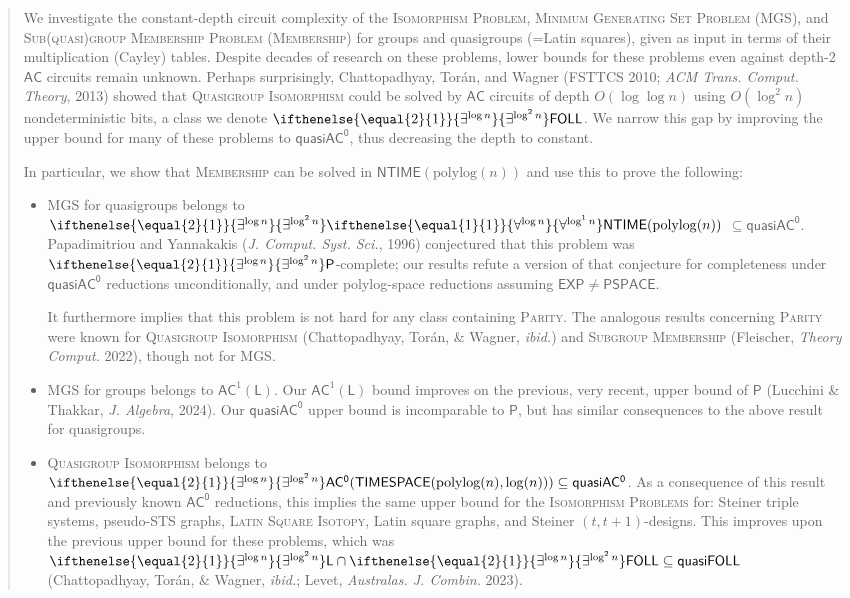 \documentclass{article}
\newcommand{\algprobm}[1]{\textsc{#1}\xspace}
\newcommand{\betacc}[1]{\ifthenelse{\equal{#1}{1}}{\exists^{\log n}}{\exists^{\log^{#1}n}}} %
\newcommand{\alphacc}[1]{\ifthenelse{\equal{#1}{1}}{\forall^{\log n}}{\forall^{\log^{#1}n}}} %
\newcommand*{\ComplexityClass}[1]{\ensuremath{\mathsf{#1}}\xspace}
\renewcommand{\P}{\ComplexityClass{P}}
\newcommand*{\EXP}{\ComplexityClass{EXP}}
\newcommand*{\LogSpace}{\ComplexityClass{L}}
\newcommand*{\PSPACE}{\ComplexityClass{PSPACE}}
\newcommand{\AC}{\ComplexityClass{AC}}
\newcommand{\ACz}{\ComplexityClass{AC^0}}
\newcommand{\qACz}{\ComplexityClass{quasiAC^0}}
\newcommand{\FOLL}{\ComplexityClass{FOLL}}
\newcommand{\NTIME}{\ComplexityClass{NTIME}}
\begin{document}
\begin{abstract}
We investigate the constant-depth 
circuit complexity 
of the \algprobm{Isomorphism Problem}, \algprobm{Minimum Generating Set Problem} (\algprobm{MGS}), and \algprobm{Sub(quasi)group Membership Problem} (\algprobm{Membership})  for groups and quasigroups (=Latin squares), given as input in terms of their multiplication (Cayley) tables.
Despite decades of research on these problems, lower bounds for these problems even against  depth-$2$ $\AC$ circuits remain unknown. Perhaps surprisingly, Chattopadhyay, Torán, and Wagner (FSTTCS 2010; \emph{ACM Trans. Comput. Theory}, 2013) showed that \algprobm{Quasigroup Isomorphism} could be solved by $\AC$ circuits of depth $O(\log \log n)$ using $O(\log^2 n)$ nondeterministic bits, a class we denote $\betacc{2}\FOLL$. We narrow this gap by improving the upper bound for many of these problems to $\qACz$, thus decreasing the depth to constant.

In particular, we show that \algprobm{Membership} can be solved in $\NTIME(\mathrm{polylog}(n))$ and use this to prove the following:
\begin{itemize}
\item \algprobm{MGS} for quasigroups belongs to $\betacc{2}\alphacc{1}\NTIME(\mathrm{polylog}(n))$ $\subseteq \qACz$. Papadimitriou and Yannakakis (\emph{J. Comput. Syst. Sci.}, 1996) conjectured that this problem was $\betacc{2}\P$-complete; our results refute a version of that conjecture for completeness under $\qACz$ reductions unconditionally, and under polylog-space reductions assuming $\EXP \neq \PSPACE$. 

It furthermore implies that this problem is not hard for any class containing \algprobm{Parity}. The analogous results concerning \algprobm{Parity} were known for \algprobm{Quasigroup Isomorphism} (Chattopadhyay, Tor\'an, \& Wagner, \emph{ibid.}) and \algprobm{Subgroup Membership} (Fleischer, \textit{Theory Comput.} 2022), though not for \algprobm{MGS}.

\item \algprobm{MGS} for groups belongs to $\AC^{1}(\LogSpace)$. Our $\AC^{1} (\LogSpace)$ bound improves on the previous, very recent, upper bound of $\mathsf{P}$ (Lucchini \& Thakkar, \textit{J. Algebra}, 2024). Our $\qACz$ upper bound is incomparable to $\P$, but has similar consequences to the above result for quasigroups. 

\item \algprobm{Quasigroup Isomorphism} belongs to $\betacc{2}\ACz(\mathsf{TIMESPACE}(\text{polylog}(n), \log(n))) \subseteq \qACz$. As a consequence of this result and previously known $\ACz$ reductions, this implies the same upper bound for the \algprobm{Isomorphism Problems} for: Steiner triple systems, pseudo-STS graphs, \algprobm{Latin Square Isotopy}, Latin square graphs, and Steiner $(t,t+1)$-designs. 
This improves upon the previous upper bound for these problems, which was $\betacc{2}\LogSpace \cap \betacc{2}\FOLL \subseteq \mathsf{quasiFOLL}$ (Chattopadhyay, Tor\'an, \& Wagner, \emph{ibid.}; Levet, \textit{Australas. J. Combin.} 2023).


\end{itemize}
\end{abstract}
\end{document}
